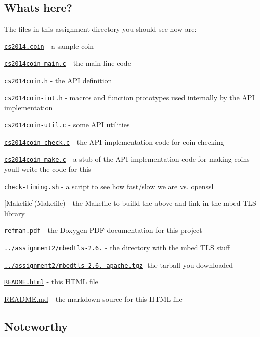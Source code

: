 \subsection*{What\textquotesingle{}s here?}

The files in this assignment directory you should see now are\+:


\begin{DoxyItemize}
\item \href{cs2014.coin}{\tt cs2014.\+coin} -\/ a sample coin
\item \href{cs2014coin-main.c}{\tt cs2014coin-\/main.\+c} -\/ the main line code
\item \href{cs201coin.h}{\tt cs2014coin.\+h} -\/ the A\+PI definition
\item \href{cs201coin.h}{\tt cs2014coin-\/int.\+h} -\/ macros and function prototypes used internally by the A\+PI implementation
\item \href{cs2014coin-check.c}{\tt cs2014coin-\/util.\+c} -\/ some A\+PI utilities
\item \href{cs2014coin-check.c}{\tt cs2014coin-\/check.\+c} -\/ the A\+PI implementation code for coin checking
\item \href{cs2014coin-make.c}{\tt cs2014coin-\/make.\+c} -\/ a stub of the A\+PI implementation code for making coins -\/ you\textquotesingle{}ll write the code for this
\item \href{./check-timing.sh}{\tt check-\/timing.\+sh} -\/ a script to see how fast/slow we are vs. openssl
\item \mbox{[}Makefile\mbox{]}(Makefile) -\/ the Makefile to builld the above and link in the mbed T\+LS library
\item \href{./refman.pdf}{\tt refman.\+pdf} -\/ the Doxygen P\+DF documentation for this project
\item \href{../assignment2/mbedtls-2.6.0/}{\tt ../assignment2/mbedtls-\/2.6.} -\/ the directory with the mbed T\+LS stuff
\item \href{https://tls.mbed.org/download/start/mbedtls-2.6.0-apache.tgz}{\tt ../assignment2/mbedtls-\/2.6.-\/apache.\+tgz}-\/ the tarball you downloaded
\item \href{README.html}{\tt R\+E\+A\+D\+M\+E.\+html} -\/ this H\+T\+ML file
\item \hyperlink{md_README}{R\+E\+A\+D\+ME.md} -\/ the markdown source for this H\+T\+ML file
\end{DoxyItemize}

\subsection*{Noteworthy}

